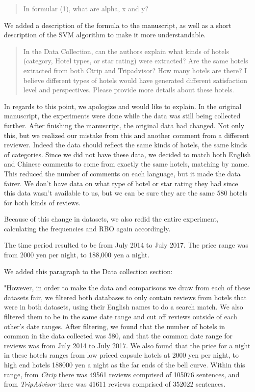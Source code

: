 \documentclass{letter}
\begin{document}
\begin{quotation}
In formular (1), what are alpha, x and y?
\end{quotation}

We added a description of the formula to the manuscript, as well as a short description of the SVM algorithm to make it more understandable.


\begin{quotation}
In the Data Collection, can the authors explain what kinds of hotels (category, Hotel types, or star rating) were extracted? Are the same hotels extracted from both Ctrip and Tripadvisor? How many hotels are there? I believe different types of hotels would have generated different satisfaction level and perspectives. Please provide more details about these hotels.
\end{quotation}

In regards to this point, we apologize and would like to explain. In the original manuscript, the experiments were done while the data was still being collected further. After finishing the manuscript, the original data had changed. Not only this, but we realized our mistake from this and another comment from a different reviewer. Indeed the data should reflect the same kinds of hotels, the same kinds of categories. Since we did not have these data, we decided to match both English and Chinese comments to come from exactly the same hotels, matching by name. This reduced the number of comments on each language, but it made the data fairer. We don't have data on what type of hotel or star rating they had since this data wasn't available to us, but we can be sure they are the same 580 hotels for both kinds of reviews. 

Because of this change in datasets, we also redid the entire experiment, calculating the frequencies and RBO again accordingly. 

The time period resulted to be from July 2014 to July 2017. The price range was from 2000 yen per night, to 188,000 yen a night.

We added this paragraph to the Data collection section:

"However, in order to make the data and comparisons we draw from each of these datasets fair, we filtered both databases to only contain reviews from hotels that were in both datasets, using their English names to do a search match. We also filtered them to be in the same date range and cut off reviews outside of each other's date ranges. After filtering, we found that the number of hotels in common in the data collected was \num[group-separator={,}]{580}, and that the common date range for reviews was from July 2014 to July 2017. We also found that the price for a night in these hotels ranges from low priced capsule hotels at 2000 yen per night, to high end hotels \num[group-separator={,}]{188000} yen a night as the far ends of the bell curve. Within this range, from \textit{Ctrip} there was \num[group-separator={,}]{49561} reviews comprised of \num[group-separator={,}]{105076} sentences, and from \textit{TripAdvisor} there was \num[group-separator={,}]{41611} reviews comprised of \num[group-separator={,}]{352022} sentences.
\end{document}
